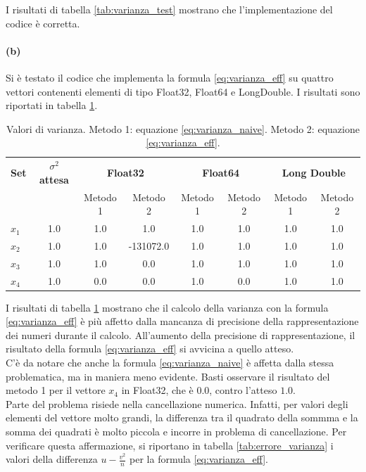 \documentclass[letterpaper, 12pt]{article}
\numberwithin{equation}{section}    %
\begin{document}
I risultati di tabella \ref{tab:varianza_test} mostrano che l'implementazione del codice è corretta.

\paragraph{(b)}Si è testato il codice che implementa la formula \ref{eq:varianza_eff} su quattro vettori contenenti
elementi di tipo Float32, Float64 e LongDouble. I risultati sono riportati in tabella \ref{tab:varianza_precisioni}.

\begin{table}[!ht]
\centering
\caption{Valori di varianza. Metodo 1: equazione \ref{eq:varianza_naive}. Metodo 2: equazione \ref{eq:varianza_eff}.}
\label{tab:varianza_precisioni}
\begin{tabular}{|l|c|cc|cc|cc|}
\hline
\textbf{Set} & \textbf{$\sigma^2$ attesa} 
& \multicolumn{2}{c|}{\textbf{Float32}} 
& \multicolumn{2}{c|}{\textbf{Float64}} 
& \multicolumn{2}{c|}{\textbf{Long Double}} \\
\cline{3-8}
      &     & Metodo 1 & Metodo 2  & Metodo 1 & Metodo 2 & Metodo 1 & Metodo 2 \\
\hline
$x_1$ & 1.0 & 1.0      & 1.0       & 1.0      & 1.0      & 1.0      & 1.0 \\
$x_2$ & 1.0 & 1.0      & -131072.0 & 1.0      & 1.0      & 1.0      & 1.0 \\
$x_3$ & 1.0 & 1.0      & 0.0       & 1.0      & 1.0      & 1.0      & 1.0 \\
$x_4$ & 1.0 & 0.0      & 0.0       & 1.0      & 0.0      & 1.0      & 1.0 \\
\hline
\end{tabular}
\end{table}

I risultati di tabella \ref{tab:varianza_precisioni} mostrano che il calcolo della varianza con la formula 
\ref{eq:varianza_eff} è più affetto dalla mancanza di precisione della rappresentazione dei numeri durante il calcolo.
All'aumento della precisione di rappresentazione, il risultato della formula \ref{eq:varianza_eff} 
si avvicina a quello atteso. \\
C'è da notare che anche la formula \ref{eq:varianza_naive} è affetta dalla stessa problematica, ma in maniera meno
evidente. Basti osservare il risultato del metodo 1 per il vettore $x_4$ in Float32, che è $0.0$, contro l'atteso 
$1.0$. \\
Parte del problema risiede nella cancellazione numerica. Infatti, per valori degli elementi del vettore molto grandi,
la differenza tra il quadrato della sommma e la somma dei quadrati è molto piccola e incorre in problema di
cancellazione. Per verificare questa affermazione, si riportano in tabella \ref{tab:errore_varianza} i valori della 
differenza \( u - \frac{v^2}{n} \)
per la formula \ref{eq:varianza_eff}.
\end{document}
